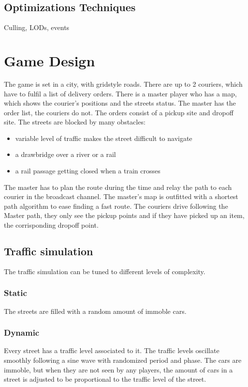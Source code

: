 \documentclass{article}
\begin{document}
\clearpage

\subsection{Optimizations Techniques}
Culling, LODs, events

\clearpage

\section{Game Design}
The game is set in a city, with gridstyle roads.
There are up to 2 couriers, which have to fulfil a list of delivery orders.
There is a master player who has a map, which shows the courier's positions and the streets status. The master has the order list, the couriers do not.
The orders consist of a pickup site and dropoff site.
The streets are blocked by many obstacles:
\begin{itemize}
  \item variable level of traffic makes the street difficult to navigate
  \item a drawbridge over a river or a rail
  \item a rail passage getting closed when a train crosses
\end{itemize}
The master has to plan the route during the time and relay the path to each courier in the broadcast channel.
The master's map is outfitted with a shortest path algorithm to ease finding a fast route.
The couriers drive following the Master path, they only see the pickup points and if they have picked up an item, the corrisponding dropoff point.

\subsection{Traffic simulation}
\label{sec:traffic_sym_design}
The traffic simulation can be tuned to different levels of complexity.
\subsubsection{Static}
The streets are filled with a random amount of immoble cars.
\subsubsection{Dynamic}
Every street has a traffic level associated to it. The traffic levels oscillate smoothly following a sine wave with randomized period and phase. The cars are immoble, but when they are not seen by any players, the amount of cars in a street is adjusted to be proportional to the traffic level of the street.
\end{document}
